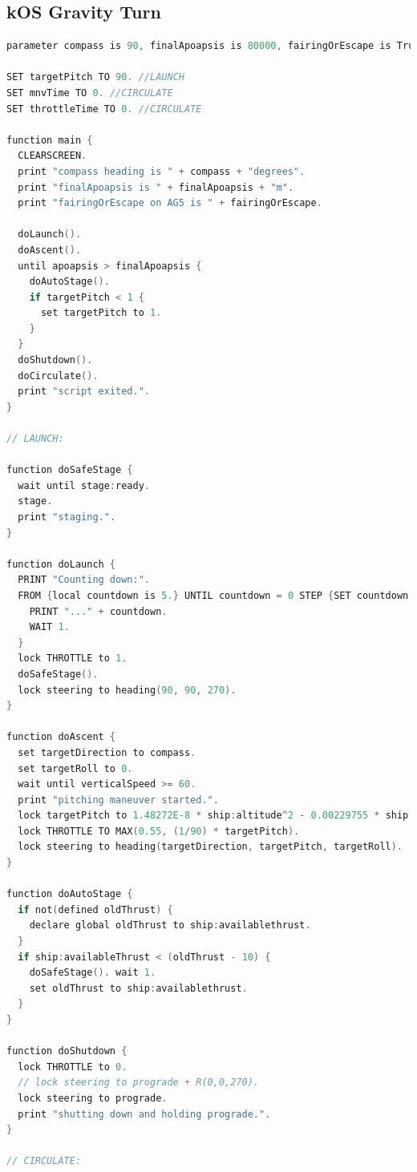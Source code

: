 \documentclass[12pt,paper=A4,numbers=noenddot,bibliography=totoc,listof=totoc,DIV=11,BCOR=1mm]{scrreprt}
\begin{document}
\subsection{kOS Gravity Turn}
\begin{lstlisting}[language=C, caption=launch.ks]
parameter compass is 90, finalApoapsis is 80000, fairingOrEscape is True.

SET targetPitch TO 90. //LAUNCH
SET mnvTime TO 0. //CIRCULATE
SET throttleTime TO 0. //CIRCULATE

function main {
  CLEARSCREEN.
  print "compass heading is " + compass + "degrees".
  print "finalApoapsis is " + finalApoapsis + "m".
  print "fairingOrEscape on AG5 is " + fairingOrEscape.

  doLaunch().
  doAscent().
  until apoapsis > finalApoapsis {
    doAutoStage().
    if targetPitch < 1 {
      set targetPitch to 1.
    }
  }
  doShutdown().
  doCirculate().
  print "script exited.".
}

// LAUNCH:

function doSafeStage {
  wait until stage:ready.
  stage.
  print "staging.".
}

function doLaunch {
  PRINT "Counting down:".
  FROM {local countdown is 5.} UNTIL countdown = 0 STEP {SET countdown to countdown - 1.} DO {
    PRINT "..." + countdown.
    WAIT 1.
  }
  lock THROTTLE to 1.
  doSafeStage().
  lock steering to heading(90, 90, 270).
}

function doAscent {
  set targetDirection to compass.
  set targetRoll to 0.
  wait until verticalSpeed >= 60.
  print "pitching maneuver started.".
  lock targetPitch to 1.48272E-8 * ship:altitude^2 - 0.00229755 * ship:altitude + 90.
  lock THROTTLE TO MAX(0.55, (1/90) * targetPitch).
  lock steering to heading(targetDirection, targetPitch, targetRoll).
}

function doAutoStage {
  if not(defined oldThrust) {
    declare global oldThrust to ship:availablethrust.
  }
  if ship:availableThrust < (oldThrust - 10) {
    doSafeStage(). wait 1.
    set oldThrust to ship:availablethrust.
  }
}

function doShutdown {
  lock THROTTLE to 0.
  // lock steering to prograde + R(0,0,270).
  lock steering to prograde.
  print "shutting down and holding prograde.".
}

// CIRCULATE:


\end{lstlisting}
\end{document}
